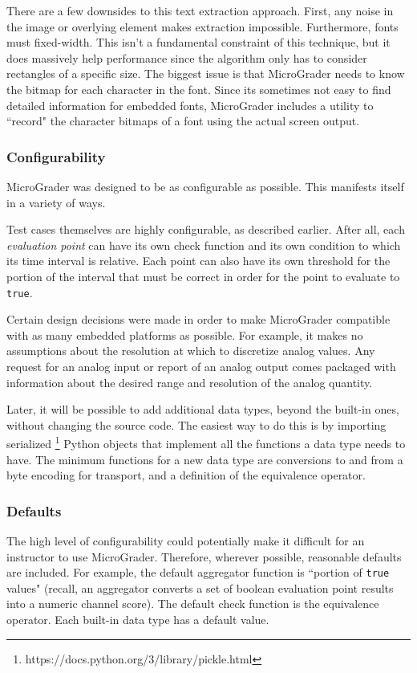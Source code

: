 \documentclass[12pt]{article}
\begin{document}
There are a few downsides to this text extraction approach.  First, any noise in the image or overlying element makes extraction impossible.  Furthermore, fonts must fixed-width.  This isn't a fundamental constraint of this technique, but it does massively help performance since the algorithm only has to consider rectangles of a specific size.  The biggest issue is that MicroGrader needs to know the bitmap for each character in the font.  Since its sometimes not easy to find detailed information for embedded fonts, MicroGrader includes a utility to ``record" the character bitmaps of a font using the actual screen output.

\subsubsection{Configurability}
MicroGrader was designed to be as configurable as possible.  This manifests itself in a variety of ways.

Test cases themselves are highly configurable, as described earlier.  After all, each \textit{evaluation point} can have its own check function and its own condition to which its time interval is relative.  Each point can also have its own threshold for the portion of the interval that must be correct in order for the point to evaluate to \texttt{true}.

Certain design decisions were made in order to make MicroGrader compatible with as many embedded platforms as possible.  For example, it makes no assumptions about the resolution at which to discretize analog values.  Any request for an analog input or report of an analog output comes packaged with information about the desired range and resolution of the analog quantity.

Later, it will be possible to add additional data types, beyond the built-in ones, without changing the source code.  The easiest way to do this is by importing serialized \footnote{https://docs.python.org/3/library/pickle.html} Python objects that implement all the functions a data type needs to have.  The minimum functions for a new data type are conversions to and from a byte encoding for transport, and a definition of the equivalence operator.

\subsubsection{Defaults}
The high level of configurability could potentially make it difficult for an instructor to use MicroGrader.  Therefore, wherever possible, reasonable defaults are included.  For example, the default aggregator function is ``portion of \texttt{true} values" (recall, an aggregator converts a set of boolean evaluation point results into a numeric channel score).  The default check function is the equivalence operator.  Each built-in data type has a default value.
\end{document}
